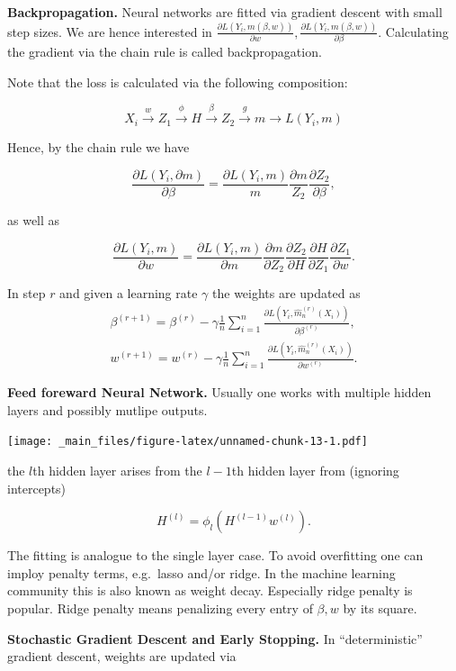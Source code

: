 \documentclass[
]{book}
\begin{document}
\textbf{Backpropagation.} Neural networks are fitted via gradient descent with small step sizes. We are hence interested in \(\frac{\partial L(Y_i,m(\beta,w))}{\partial w}, \frac{\partial L(Y_i,m(\beta,w))}{\partial \beta}.\) Calculating the gradient via the chain rule is called backpropagation.

Note that the loss is calculated via the following composition:

\[
X_i \stackrel{w}{\rightarrow } Z_1 \stackrel{\phi}{\rightarrow } H \stackrel{\beta}{\rightarrow }Z_2\stackrel{g}{\rightarrow } m \stackrel{}{\rightarrow } L(Y_i,m)
\]

Hence, by the chain rule we have

\[
\frac{\partial L(Y_i, \partial m)}{\partial \beta}=\frac{\partial L(Y_i,m)}{m}\frac{\partial m}{Z_2}  \frac{\partial Z_2}{\partial \beta},
\]

as well as

\[
\frac{\partial L(Y_i,m)}{\partial w}=\frac{\partial L(Y_i,m)}{\partial m}\frac{\partial m}{\partial Z_2} \frac{\partial Z_2}{\partial H} \frac{\partial H}{\partial Z_1}\frac{\partial Z_1}{\partial w}.
\]

In step \(r\) and given a learning rate \(\gamma\) the weights are updated as
\begin{align*}
\beta^{(r+1)}= \beta^{(r)} -\gamma \frac 1 n \sum_{i=1}^n\frac{\partial L(Y_i,\hat m_n^{(r)}(X_i))}{\partial \beta^{(r)}},  \\
w^{(r+1)}= w^{(r)} -\gamma  \frac 1 n \sum_{i=1}^n \frac{\partial L(Y_i,\hat m_n^{(r)}(X_i))}{\partial w^{(r)}}. 
\end{align*}

\textbf{Feed foreward Neural Network.} Usually one works with multiple hidden layers and possibly mutlipe outputs.

\texttt{[image: \_main\_files/figure-latex/unnamed-chunk-13-1.pdf]}

the \(l\)th hidden layer arises from the \(l-1\)th hidden layer from (ignoring intercepts)

\[
H^{(l)}=\phi_l(H^{(l-1)}w^{(l)}).
\]

The fitting is analogue to the single layer case. To avoid overfitting one can imploy penalty terms, e.g.~lasso and/or ridge. In the machine learning community this is also known as weight decay. Especially ridge penalty is popular. Ridge penalty means penalizing every entry of \(\beta, w\) by its square.

\textbf{Stochastic Gradient Descent and Early Stopping.} In ``deterministic'' gradient descent, weights are updated via
\end{document}
